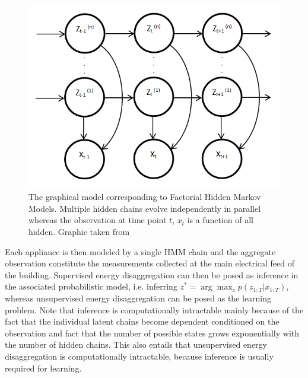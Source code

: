 \documentclass[11pt]{cmuthesis} %
\begin{document}
\begin{figure}
\centering
\includegraphics[width=0.5\linewidth]{FHMM.png}
\caption[The graphical model corresponding to Factorial Hidden Markov Models.]{The graphical model corresponding to Factorial Hidden Markov Models. Multiple hidden chains evolve independently in parallel whereas the observation at time point $t$, $x_t$ is a function of all hidden. Graphic taken from~\cite{parson2012non}}
\label{fig:fhmm}
\end{figure}

Each appliance is then modeled by a single HMM chain and the aggregate observation constitute the measurements collected at the main electrical feed of the building. Supervised energy disaggregation can then be posed as inference in the associated probabilistic model, i.e. inferring $z^* = \arg\max_z p(z_{1:T}|x_{1:T})$, whereas unsupervised energy disaggregation can be posed as the learning problem. Note that inference is computationally intractable mainly because of the fact that the individual latent chains become dependent conditioned on the observation and fact that the number of possible states grows exponentially with the number of hidden chains. This also entails that unsupervised energy disaggregation is computationally intractable, because inference is usually required for learning.
\end{document}
